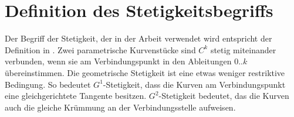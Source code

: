 \section{Definition des Stetigkeitsbegriffs}
\label{sec:smoothness-definition}
Der Begriff der Stetigkeit, der in der Arbeit verwendet wird entspricht der Definition in \cite[S. 193ff]{farin_handbook_2002}.
Zwei parametrische Kurvenstücke sind $C^k$ stetig miteinander verbunden, wenn sie am Verbindungspunkt in den Ableitungen $0..k$ übereinstimmen. Die geometrische Stetigkeit ist eine etwas weniger restriktive Bedingung. So bedeutet $G^1$-Stetigkeit, dass die Kurven am Verbindungspunkt eine gleichgerichtete Tangente besitzen. $G^2$-Stetigkeit bedeutet, das die Kurven auch die gleiche Krümmung an der Verbindungsstelle aufweisen.